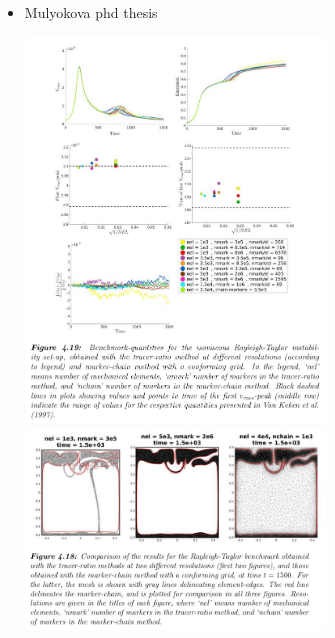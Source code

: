 \begin{itemize}
\item Mulyokova phd thesis \cite{mulyukova} 

\begin{center}
\includegraphics[width=8cm]{images/benchmark_vaks97/mulyukova1}
\includegraphics[width=8cm]{images/benchmark_vaks97/mulyukova2}
\end{center}


\end{itemize}

